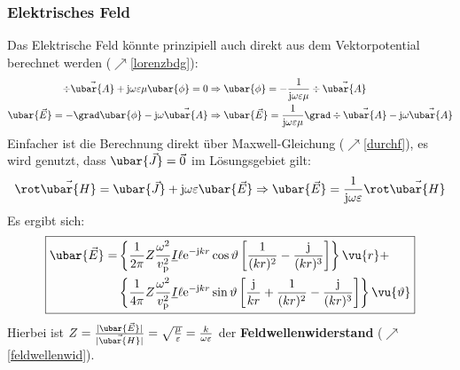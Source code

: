   \subsubsection{Elektrisches Feld}
	 Das Elektrische Feld könnte prinzipiell auch direkt aus dem Vektorpotential berechnet werden ($\nearrow$\ref{lorenzbdg}):
		        \begin{equation}\begin{split}
				        \div  \vec{\ubar{A}} + \mathrm{j}\omega \varepsilon\mu \ubar{\phi}  = 0 &\Rightarrow \ubar{\phi} = -\frac{1}{\mathrm{j}\omega \varepsilon\mu} \div  \vec{\ubar{A}}\\
				        \ubar{\vec{E}} = -\grad \ubar{\phi} - \mathrm{j}\omega  \vec{\ubar{A}} &\Rightarrow \ubar{\vec{E}}  = \frac{1}{\mathrm{j}\omega \varepsilon\mu} \grad \div  \vec{\ubar{A}}- \mathrm{j}\omega  \vec{\ubar{A}}
			        \end{split}\end{equation}
 Einfacher ist die Berechnung direkt über Maxwell-Gleichung ($\nearrow$\ref{durchf}), es wird genutzt, dass $ \ubar{\vec{J}} = \vec{0}$ im Lösungsgebiet gilt:
		        \begin{equation}
			        \rot \vec{\ubar{H}} = \ubar{\vec{J}} + \mathrm{j}\omega\varepsilon\ubar{\vec{E}} \Rightarrow \ubar{\vec{E}} = \frac{1}{\mathrm{j}\omega\varepsilon} \rot \vec{\ubar{H}}
		        \end{equation}
 Es ergibt sich:
		        \begin{equation}\label{dipefeld}\boxed{\begin{split}
				        \ubar{\vec{E}} = &\left\{\frac{1}{2\pi} Z \frac{\omega^2}{ v_\mathrm{p}^2}\underline{I} \ell   \mathrm{e}^{-\mathrm{j} kr} \cos\vartheta\left[\frac{1}{( kr)^2} - \frac{\mathrm{j}}{( kr)^3}\right]\right\} \vu{r} + \\
				        &\left\{ \frac{1}{4\pi} Z \frac{\omega^2}{ v_\mathrm{p}^2}\underline{I} \ell   \mathrm{e}^{-\mathrm{j} kr} \sin\vartheta\left[\frac{\mathrm{j}}{ kr}  + \frac{1}{( kr)^2} - \frac{\mathrm{j}}{( kr)^3} \right] \right\} \vu{\vartheta}
			        \end{split}}\end{equation}
		        Hierbei ist \(Z=\frac{|\ubar{\vec{E}}|}{|\vec{\ubar{H}}|} = \sqrt{\frac{\mu}{\varepsilon}} = \frac{ k}{\omega\varepsilon}\) der \textbf{Feldwellenwiderstand} ($\nearrow$\ref{feldwellenwid}).
